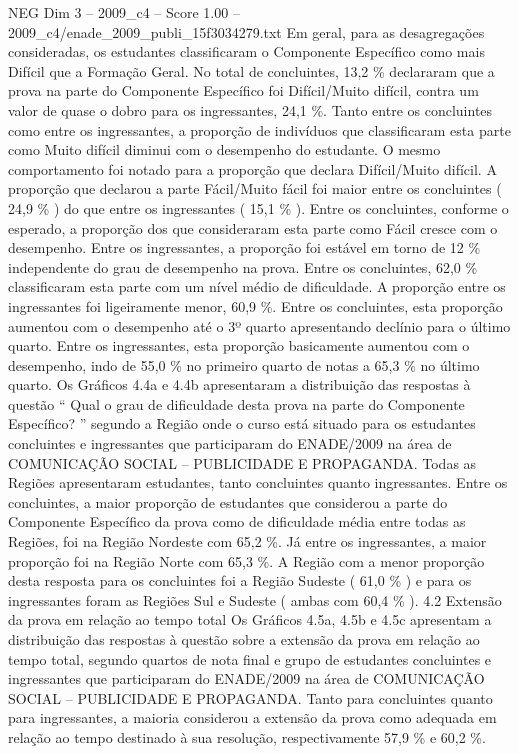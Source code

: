 \begin{textsample}{NEG Dim 3 – 2009\_c4 – Score 1.00 – 2009\_c4/enade\_2009\_publi\_15f3034279.txt}
Em geral, para as desagregações consideradas, os estudantes classificaram o Componente Específico como mais Difícil que a Formação Geral.
No total de concluintes, 13,2 \% declararam que a prova na parte do Componente Específico foi Difícil/Muito difícil, contra um valor de quase o dobro para os ingressantes, 24,1 \%.
Tanto entre os concluintes como entre os ingressantes, a proporção de indivíduos que classificaram esta parte como Muito difícil diminui com o desempenho do estudante.
O mesmo comportamento foi notado para a proporção que declara Difícil/Muito difícil.
A proporção que declarou a parte Fácil/Muito fácil foi maior entre os concluintes ( 24,9 \% ) do que entre os ingressantes ( 15,1 \% ).
Entre os concluintes, conforme o esperado, a proporção dos que consideraram esta parte como Fácil cresce com o desempenho.
Entre os ingressantes, a proporção foi estável em torno de 12 \% independente do grau de desempenho na prova.
Entre os concluintes, 62,0 \% classificaram esta parte com um nível médio de dificuldade.
A proporção entre os ingressantes foi ligeiramente menor, 60,9 \%.
Entre os concluintes, esta proporção aumentou com o desempenho até o 3º quarto apresentando declínio para o último quarto.
Entre os ingressantes, esta proporção basicamente aumentou com o desempenho, indo de 55,0 \% no primeiro quarto de notas a 65,3 \% no último quarto.
Os Gráficos 4.4a e 4.4b apresentaram a distribuição das respostas à questão “ Qual o grau de dificuldade desta prova na parte do Componente Específico? ” segundo a Região onde o curso está situado para os estudantes concluintes e ingressantes que participaram do ENADE/2009 na área de COMUNICAÇÃO SOCIAL – PUBLICIDADE E PROPAGANDA.
Todas as Regiões apresentaram estudantes, tanto concluintes quanto ingressantes.
Entre os concluintes, a maior proporção de estudantes que considerou a parte do Componente Específico da prova como de dificuldade média entre todas as Regiões, foi na Região Nordeste com 65,2 \%.
Já entre os ingressantes, a maior proporção foi na Região Norte com 65,3 \%.
A Região com a menor proporção desta resposta para os concluintes foi a Região Sudeste ( 61,0 \% ) e para os ingressantes foram as Regiões Sul e Sudeste ( ambas com 60,4 \% ). 4.2 Extensão da prova em relação ao tempo total Os Gráficos 4.5a, 4.5b e 4.5c apresentam a distribuição das respostas à questão sobre a extensão da prova em relação ao tempo total, segundo quartos de nota final e grupo de estudantes concluintes e ingressantes que participaram do ENADE/2009 na área de COMUNICAÇÃO SOCIAL – PUBLICIDADE E PROPAGANDA.
Tanto para concluintes quanto para ingressantes, a maioria considerou a extensão da prova como adequada em relação ao tempo destinado à sua resolução, respectivamente 57,9 \% e 60,2 \%.

\end{textsample}
